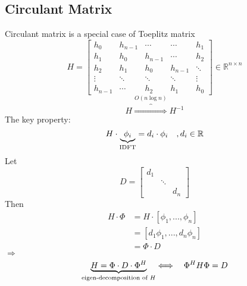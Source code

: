 \begin{multicols}{2}
\subsection{Circulant Matrix}
Circulant matrix is a special case of Toeplitz matrix
\[
    H = 
    \begin{bmatrix}
        h_{0}  & h_{n-1} & \cdots  & \cdots  & h_{1}    \\
        h_{1}  & h_{0}   & h_{n-1} & \cdots  & h_{2}    \\
        h_{2}  & h_{1}   & h_{0}   & h_{n-1} & \ddots       \\
        \vdots & \ddots  &\ddots   & \ddots  & \vdots       \\
        h_{n-1}& \cdots  &h_{2}    & h_{1}   & h_{0}
    \end{bmatrix}
    \in\mathbb{R}^{n\times n}
\]
\[
    H\overbrace{\Longrightarrow}^{O(n\log n)} H^{-1}
\]
The key property:
\[
    H\cdot \underbrace{\phi_i}_{\text{\rm IDFT}} = d_i\cdot \phi_i\quad , d_i\in\mathbb{R}
\]
Let 
\[
    D = \begin{bmatrix}
        d_1 && \\
        & \ddots & \\
        && d_n 
    \end{bmatrix}
\]
Then 
\[
    \begin{array}{ll}
        H\cdot\Phi &= H\cdot [\phi_1,...,\phi_n]\\
                   &= [d_1\phi_1,...,d_n\phi_n] \\
                   &= \Phi\cdot D
    \end{array}
\]
$\Longrightarrow$
\[
    \underbrace{H = \Phi\cdot D \cdot \Phi^H}_{\text{\rm eigen-decomposition of } H} \Longleftrightarrow \quad \Phi^H H \Phi = D
\]
\newpage
\end{multicols}

